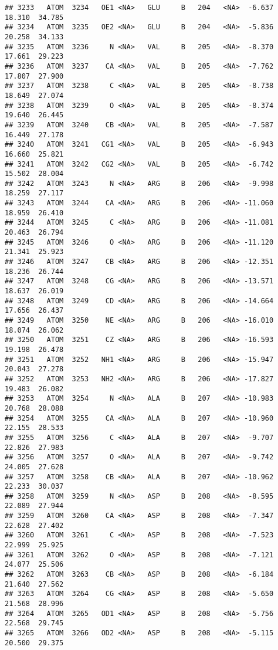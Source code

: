 \documentclass[
]{article}
\begin{document}
\begin{verbatim}
## 3233   ATOM  3234   OE1 <NA>   GLU     B   204   <NA>  -6.637  18.310  34.785
## 3234   ATOM  3235   OE2 <NA>   GLU     B   204   <NA>  -5.836  20.258  34.133
## 3235   ATOM  3236     N <NA>   VAL     B   205   <NA>  -8.370  17.661  29.223
## 3236   ATOM  3237    CA <NA>   VAL     B   205   <NA>  -7.762  17.807  27.900
## 3237   ATOM  3238     C <NA>   VAL     B   205   <NA>  -8.738  18.649  27.074
## 3238   ATOM  3239     O <NA>   VAL     B   205   <NA>  -8.374  19.640  26.445
## 3239   ATOM  3240    CB <NA>   VAL     B   205   <NA>  -7.587  16.449  27.178
## 3240   ATOM  3241   CG1 <NA>   VAL     B   205   <NA>  -6.943  16.660  25.821
## 3241   ATOM  3242   CG2 <NA>   VAL     B   205   <NA>  -6.742  15.502  28.004
## 3242   ATOM  3243     N <NA>   ARG     B   206   <NA>  -9.998  18.259  27.117
## 3243   ATOM  3244    CA <NA>   ARG     B   206   <NA> -11.060  18.959  26.410
## 3244   ATOM  3245     C <NA>   ARG     B   206   <NA> -11.081  20.463  26.794
## 3245   ATOM  3246     O <NA>   ARG     B   206   <NA> -11.120  21.341  25.923
## 3246   ATOM  3247    CB <NA>   ARG     B   206   <NA> -12.351  18.236  26.744
## 3247   ATOM  3248    CG <NA>   ARG     B   206   <NA> -13.571  18.637  26.019
## 3248   ATOM  3249    CD <NA>   ARG     B   206   <NA> -14.664  17.656  26.437
## 3249   ATOM  3250    NE <NA>   ARG     B   206   <NA> -16.010  18.074  26.062
## 3250   ATOM  3251    CZ <NA>   ARG     B   206   <NA> -16.593  19.198  26.478
## 3251   ATOM  3252   NH1 <NA>   ARG     B   206   <NA> -15.947  20.043  27.278
## 3252   ATOM  3253   NH2 <NA>   ARG     B   206   <NA> -17.827  19.483  26.082
## 3253   ATOM  3254     N <NA>   ALA     B   207   <NA> -10.983  20.768  28.088
## 3254   ATOM  3255    CA <NA>   ALA     B   207   <NA> -10.960  22.155  28.533
## 3255   ATOM  3256     C <NA>   ALA     B   207   <NA>  -9.707  22.826  27.983
## 3256   ATOM  3257     O <NA>   ALA     B   207   <NA>  -9.742  24.005  27.628
## 3257   ATOM  3258    CB <NA>   ALA     B   207   <NA> -10.962  22.233  30.037
## 3258   ATOM  3259     N <NA>   ASP     B   208   <NA>  -8.595  22.089  27.944
## 3259   ATOM  3260    CA <NA>   ASP     B   208   <NA>  -7.347  22.628  27.402
## 3260   ATOM  3261     C <NA>   ASP     B   208   <NA>  -7.523  22.999  25.925
## 3261   ATOM  3262     O <NA>   ASP     B   208   <NA>  -7.121  24.077  25.506
## 3262   ATOM  3263    CB <NA>   ASP     B   208   <NA>  -6.184  21.640  27.562
## 3263   ATOM  3264    CG <NA>   ASP     B   208   <NA>  -5.650  21.568  28.996
## 3264   ATOM  3265   OD1 <NA>   ASP     B   208   <NA>  -5.756  22.568  29.745
## 3265   ATOM  3266   OD2 <NA>   ASP     B   208   <NA>  -5.115  20.500  29.375

\end{verbatim}
\end{document}

